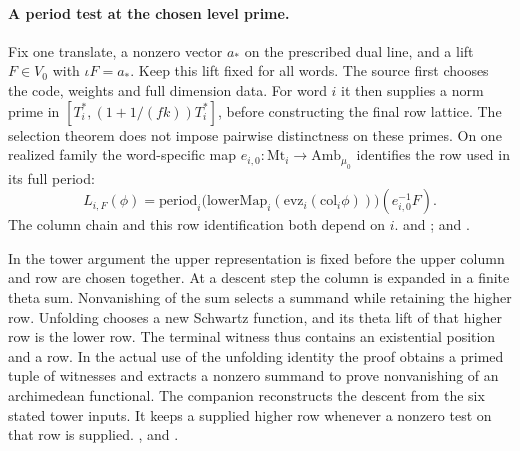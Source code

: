 \paragraph{A period test at the chosen level prime.}
Fix one translate, a nonzero vector \(a_*\) on the prescribed dual
line, and a lift \(F\in V_0\) with \(\iota F=a_*\). Keep this lift
fixed for all words. The source first chooses the code, weights and
full dimension data. For word \(i\) it then supplies a norm prime
in \([T_i^*,(1+1/(fk))T_i^*]\), before constructing the final row
lattice. The selection theorem does not impose pairwise distinctness
on these primes. On one realized family the word-specific map
\(e_{i,0}:\mathrm{Mt}_i\longrightarrow\mathrm{Amb}_{\mu_0}\)
identifies the row used in its full period:
\[
 L_{i,F}(\phi)=
  \mathrm{period}_i\bigl(\mathrm{lowerMap}_i
       (\mathrm{evz}_i(\mathrm{col}_i\phi))\bigr)(e_{i,0}^{-1}F).
\]
The column chain and this row identification both depend on \(i\).
and ;
and .

In the tower argument the upper representation is fixed before the
upper column and row are chosen together. At a descent step the
column is expanded in a finite theta sum. Nonvanishing of the sum
selects a summand while retaining the higher row. Unfolding chooses
a new Schwartz function, and its theta lift of that higher row is
the lower row. The terminal witness thus contains an existential
position and a row. In the actual use of the unfolding identity
the proof obtains a primed tuple of witnesses and extracts a nonzero
summand to prove nonvanishing of an archimedean functional.
The companion  reconstructs the
descent from the six stated tower inputs. It keeps a supplied
higher row whenever a nonzero test on that row is supplied.
,
 and
.

